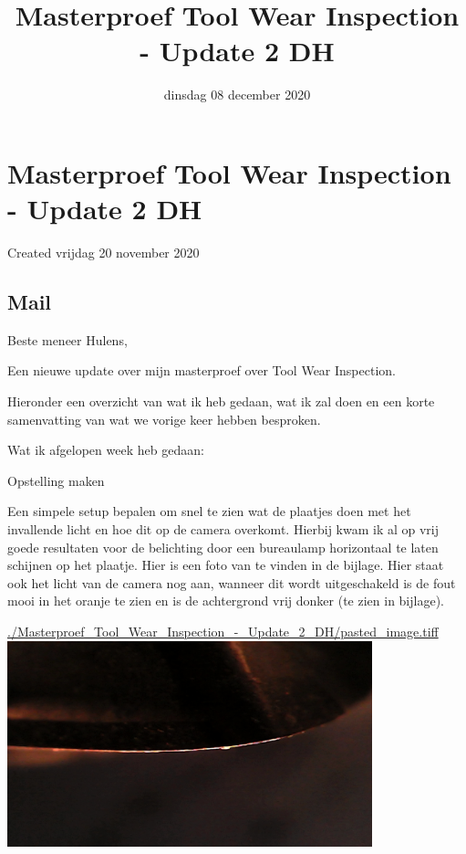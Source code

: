 \documentclass{scrartcl}
\title{Masterproef Tool Wear Inspection - Update 2 DH}
\date{dinsdag 08 december 2020}
\author{}
\begin{document}
\maketitle

		\section{Masterproef Tool Wear Inspection - Update 2 DH}

Created vrijdag 20 november 2020



\subsection{Mail}

Beste meneer Hulens,

 

Een nieuwe update over mijn masterproef over Tool Wear Inspection.

Hieronder een overzicht van wat ik heb gedaan, wat ik zal doen en een korte samenvatting van wat we vorige keer hebben besproken.

 

Wat ik afgelopen week heb gedaan:

Opstelling maken

Een simpele setup bepalen om snel te zien wat de plaatjes doen met het invallende licht en hoe dit op de camera overkomt. Hierbij kwam ik al op vrij goede resultaten voor de belichting door een bureaulamp horizontaal te laten schijnen op het plaatje. Hier is een foto van te vinden in de bijlage. Hier staat ook het licht van de camera nog aan, wanneer dit wordt uitgeschakeld is de fout mooi in het oranje te zien en is de achtergrond vrij donker (te zien in bijlage).





\href{./Masterproef_Tool_Wear_Inspection_-_Update_2_DH/pasted_image.tiff}{./Masterproef_Tool_Wear_Inspection_-_Update_2_DH/pasted_image.tiff}\includegraphics[width=4.166667in, keepaspectratio=true]{./Masterproef_Tool_Wear_Inspection_-_Update_2_DH/eerste-opstelling_donkere_achtergrond3.jpg}
\end{document}

